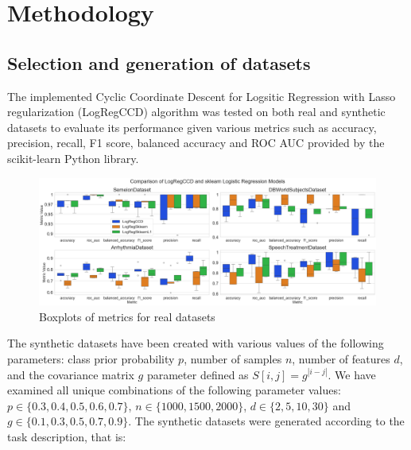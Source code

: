 \documentclass[12pt]{article}
\begin{document}
\section{Methodology}

\subsection{Selection and generation of datasets}

The implemented Cyclic Coordinate Descent for Logsitic Regression with Lasso regularization (LogRegCCD) algorithm was tested on both real and synthetic datasets to evaluate its performance given various metrics such as accuracy, precision, recall, F1 score, balanced accuracy and ROC AUC \cite{powers2011evaluation, brodersen2010balanced, fawcett2006introduction} provided by the scikit-learn \cite{scikit-learn} Python \cite{python} library. \par 



\begin{figure}[h]
    \centering
  \includegraphics[width=\textwidth]{../results/real_data_boxplots.png}
    \caption{Boxplots of metrics for real datasets}
    \label{fig:real-data-boxplots}
  \end{figure}

The synthetic datasets have been created with various values of the following parameters: class prior probability $p$, number of samples $n$, number of features $d$, and the covariance matrix $g$ parameter defined as $S[i,j] = g^{|i-j|}$. We have examined all unique combinations of the following parameter values: $p \in \{0.3, 0.4, 0.5, 0.6, 0.7\}$, $n \in \{1000, 1500, 2000\}$, $d \in \{2, 5, 10, 30\}$ and $g \in \{0.1, 0.3, 0.5, 0.7, 0.9\}$. The synthetic datasets were generated according to the task description, that is:
\end{document}
